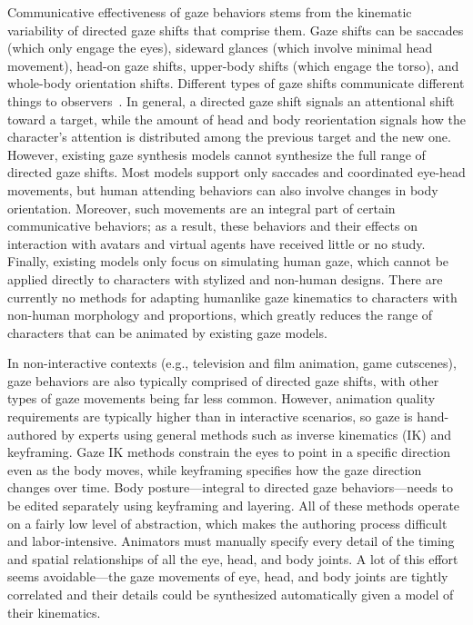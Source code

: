 Communicative effectiveness of gaze behaviors stems from the kinematic variability of directed gaze shifts that comprise them. Gaze shifts can be saccades (which only engage the eyes), sideward glances (which involve minimal head movement), head-on gaze shifts, upper-body shifts (which engage the torso), and whole-body orientation shifts. Different types of gaze shifts communicate different things to observers~\citep{langton2000eyes}. In general, a directed gaze shift signals an attentional shift toward a target, while the amount of head and body reorientation signals how the character's attention is distributed among the previous target and the new one.
However, existing gaze synthesis models cannot synthesize the full range of directed gaze shifts. Most models support only saccades and coordinated eye-head movements, but human attending behaviors can also involve changes in body orientation. Moreover, such movements are an integral part of certain communicative behaviors; as a result, these behaviors and their effects on interaction with avatars and virtual agents have received little or no study. Finally, existing models only focus on simulating human gaze, which cannot be applied directly to characters with stylized and non-human designs. There are currently no methods for adapting humanlike gaze kinematics to characters with non-human morphology and proportions, which greatly reduces the range of characters that can be animated by existing gaze models.

In non-interactive contexts (e.g., television and film animation, game cutscenes), gaze behaviors are also typically comprised of directed gaze shifts, with other types of gaze movements being far less common. However, animation quality requirements are typically higher than in interactive scenarios, so gaze is hand-authored by experts using general methods such as inverse kinematics (IK) and keyframing. Gaze IK methods constrain the eyes to point in a specific direction even as the body moves, while keyframing specifies how the gaze direction changes over time. Body posture---integral to directed gaze behaviors---needs to be edited separately using keyframing and layering. All of these methods operate on a fairly low level of abstraction, which makes the authoring process difficult and labor-intensive. Animators must manually specify every detail of the timing and spatial relationships of all the eye, head, and body joints. A lot of this effort seems avoidable---the gaze movements of eye, head, and body joints are tightly correlated and their details could be synthesized automatically given a model of their kinematics.

